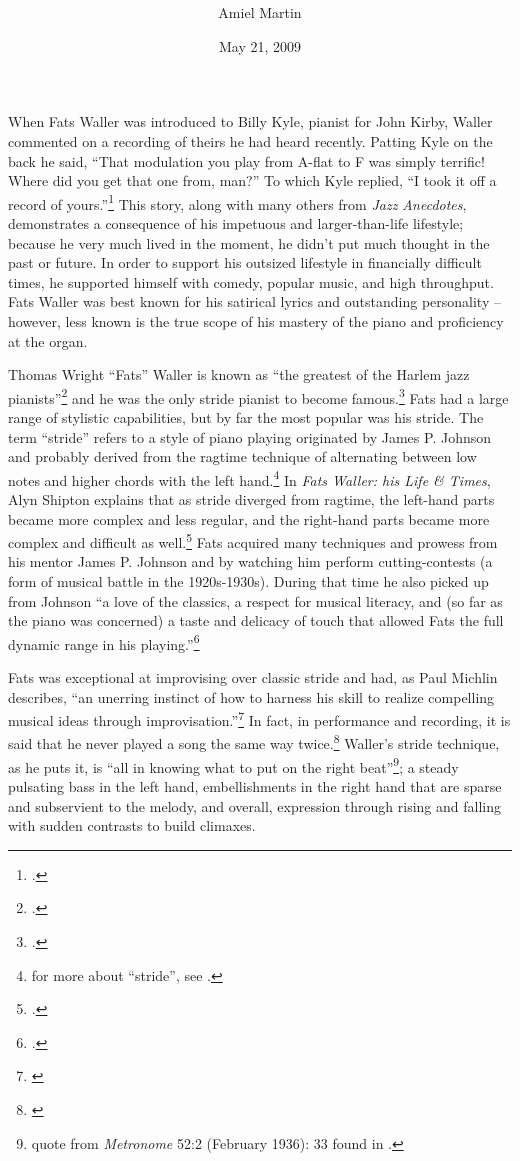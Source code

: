 \documentclass[11pt]{report}
\title{\fattitle \\
		\large \fatslogan}
\author{Amiel Martin}
\date{May 21, 2009}
\begin{document}
	\maketitle

	\label{sec:introduction}
	When Fats Waller was introduced to Billy Kyle, pianist for John Kirby, Waller commented on a recording of theirs he had heard recently. Patting Kyle on the back he said, ``That modulation you play from A-flat to F was simply terrific! Where did you get that one from, man?'' To which Kyle replied, ``I took it off a record of yours.''\footnote{\cite[231]{anecdotes}.} This story, along with many others from \emph{Jazz Anecdotes}, demonstrates a consequence of his impetuous and larger-than-life lifestyle; because he very much lived in the moment, he didn't put much thought in the past or future. In order to support his outsized lifestyle in financially difficult times, he supported himself with comedy, popular music, and high throughput. Fats Waller was best known for his satirical lyrics and outstanding personality -- however, less known is the true scope of his mastery of the piano and proficiency at the organ.

	\label{sec:piano_skills}
	Thomas Wright ``Fats'' Waller is known as ``the greatest of the Harlem jazz pianists''\footnote{\cite[2]{life}.} and he was the only stride pianist to become famous.\footnote{\cite[146]{visions}.} Fats had a large range of stylistic capabilities, but by far the most popular was his stride. The term ``stride'' refers to a style of piano playing originated by James P. Johnson and probably derived from the ragtime technique of alternating between low notes and higher chords with the left hand.\footnote{for more about ``stride'', see \cite[79]{experience}.} In \emph{Fats Waller: his Life \& Times}, Alyn Shipton explains that as stride diverged from ragtime, the left-hand parts became more complex and less regular, and the right-hand parts became more complex and difficult as well.\footnote{\cite[5]{life}.} Fats acquired many techniques and prowess from his mentor James P. Johnson and by watching him perform cutting-contests (a form of musical battle in the 1920s-1930s). During that time he also picked up from Johnson ``a love of the classics, a respect for musical literacy, and (so far as the piano was concerned) a taste and delicacy of touch that allowed Fats the full dynamic range in his playing.''\footnote{\cite[8]{life}.}
	
		Fats was exceptional at improvising over classic stride and had, as Paul Michlin describes, ``an unerring instinct of how to harness his skill to realize compelling musical ideas through improvisation.''\footnote{\cite{web:machlin}} In fact, in performance and recording, it is said that he never played a song the same way twice.\footnote{\cite{transcriptions}} Waller's stride technique, as he puts it, is ``all in knowing what to put on the right beat''\footnote{quote from \emph{Metronome} 52:2 (February 1936): 33 found in \cite{transcriptions}.}; a steady pulsating bass in the left hand, embellishments in the right hand that are sparse and subservient to the melody, and overall, expression through rising and falling with sudden contrasts to build climaxes.
	
\end{document}
